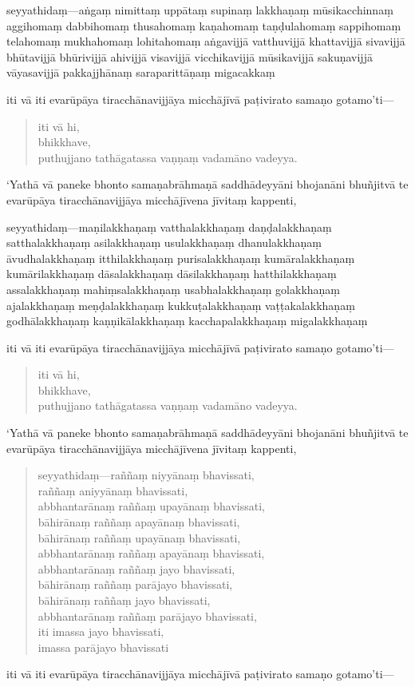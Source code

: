 \documentclass[11pt,twoside,openright]{book}
\begin{document}
\pstart
seyyathidaṃ—aṅgaṃ nimittaṃ uppātaṃ supinaṃ lakkhaṇaṃ mūsikacchinnaṃ aggihomaṃ dabbihomaṃ thusahomaṃ kaṇahomaṃ taṇḍulahomaṃ sappihomaṃ telahomaṃ mukhahomaṃ lohitahomaṃ aṅgavijjā vatthuvijjā khattavijjā sivavijjā bhūtavijjā bhūrivijjā ahivijjā visavijjā vicchikavijjā mūsikavijjā sakuṇavijjā vāyasavijjā pakkajjhānaṃ saraparittāṇaṃ migacakkaṃ
\pend

\pstart
iti vā iti evarūpāya tiracchānavijjāya micchājīvā paṭivirato samaṇo gotamo’ti—
\pend

\begin{verse}
iti vā hi,\\
\vin  bhikkhave,\\
\vin  puthujjano tathāgatassa vaṇṇaṃ vadamāno vadeyya.

\end{verse}
\pstart
‘Yathā vā paneke bhonto samaṇabrāhmaṇā saddhādeyyāni bhojanāni bhuñjitvā te evarūpāya tiracchānavijjāya micchājīvena jīvitaṃ kappenti,
\pend

\pstart
seyyathidaṃ—maṇilakkhaṇaṃ vatthalakkhaṇaṃ daṇḍalakkhaṇaṃ satthalakkhaṇaṃ asilakkhaṇaṃ usulakkhaṇaṃ dhanulakkhaṇaṃ āvudhalakkhaṇaṃ itthilakkhaṇaṃ purisalakkhaṇaṃ kumāralakkhaṇaṃ kumārilakkhaṇaṃ dāsalakkhaṇaṃ dāsilakkhaṇaṃ hatthilakkhaṇaṃ assalakkhaṇaṃ mahiṃsalakkhaṇaṃ usabhalakkhaṇaṃ golakkhaṇaṃ ajalakkhaṇaṃ meṇḍalakkhaṇaṃ kukkuṭalakkhaṇaṃ vaṭṭakalakkhaṇaṃ godhālakkhaṇaṃ kaṇṇikālakkhaṇaṃ kacchapalakkhaṇaṃ migalakkhaṇaṃ
\pend

\pstart
iti vā iti evarūpāya tiracchānavijjāya micchājīvā paṭivirato samaṇo gotamo’ti—
\pend

\begin{verse}
iti vā hi,\\
\vin  bhikkhave,\\
\vin  puthujjano tathāgatassa vaṇṇaṃ vadamāno vadeyya.

\end{verse}
\pstart
‘Yathā vā paneke bhonto samaṇabrāhmaṇā saddhādeyyāni bhojanāni bhuñjitvā te evarūpāya tiracchānavijjāya micchājīvena jīvitaṃ kappenti,
\pend

\begin{verse}
seyyathidaṃ—raññaṃ niyyānaṃ bhavissati,\\
\vin  raññaṃ aniyyānaṃ bhavissati,\\
\vin  abbhantarānaṃ raññaṃ upayānaṃ bhavissati,\\
\vin  bāhirānaṃ raññaṃ apayānaṃ bhavissati,\\
\vin  bāhirānaṃ raññaṃ upayānaṃ bhavissati,\\
\vin  abbhantarānaṃ raññaṃ apayānaṃ bhavissati,\\
\vin  abbhantarānaṃ raññaṃ jayo bhavissati,\\
\vin  bāhirānaṃ raññaṃ parājayo bhavissati,\\
\vin  bāhirānaṃ raññaṃ jayo bhavissati,\\
\vin  abbhantarānaṃ raññaṃ parājayo bhavissati,\\
\vin  iti imassa jayo bhavissati,\\
\vin  imassa parājayo bhavissati

\end{verse}
\pstart
iti vā iti evarūpāya tiracchānavijjāya micchājīvā paṭivirato samaṇo gotamo’ti—
\pend
\end{document}
